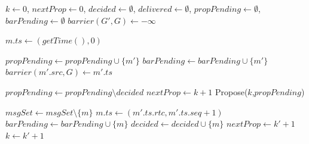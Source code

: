 \documentclass[times, 10pt]{article}
\begin{document}
\begin{algorithm}
\begin{distribalgo}[1]

\blankline
{}
  \STATE $k \leftarrow 0$, $nextProp \leftarrow 0$, $decided \leftarrow \emptyset$, $delivered \leftarrow \emptyset$, $propPending \leftarrow \emptyset$, $barPending \leftarrow \emptyset$
    \STATE $barrier(G',G) \leftarrow -\infty$ 
  \ENDINDENT
\ENDINDENT 

\blankline
{}
  \STATE $m.ts \leftarrow (getTime(),0)$
  \STATE {} \label{algline:rmlocal}
\ENDINDENT

\blankline
{}
    \STATE $propPending \leftarrow propPending \cup \{m'\}$ \label{algline:addtoproppending}
    \STATE $barPending \leftarrow barPending \cup \{m'\}$ \label{algline:insbp1}
    \STATE $barrier(m'.src,G) \leftarrow m'.ts$ \label{algline:incbar}
  \ENDIF
\ENDINDENT

\blankline
{}
    \STATE $propPending \leftarrow propPending \setminus decided$%
    \label{algline:removedecided}
      \STATE $nextProp \leftarrow k + 1$
      \STATE Propose($k$,$propPending$) \label{algline:propose}
    \ENDIF
\ENDINDENT

\blankline
{}
    \STATE $msgSet \leftarrow msgSet \setminus \{m\}$
      \STATE $m.ts \leftarrow (m'.ts.rtc, m'.ts.seq + 1)$
    \ENDIF     
     \label{algline:checkcons}
      \STATE $barPending \leftarrow barPending \cup \{m\}$  \label{algline:insbp2}
    \ENDIF
    \STATE $decided \leftarrow decided \cup \{m\}$  \label{algline:addtodecided}
    \STATE {} \label{algline:rmothers}
  \ENDINDENT
  \STATE $nextProp \leftarrow k' + 1$
  \STATE $k \leftarrow k' + 1$
\ENDINDENT


\end{distribalgo}
\end{algorithm}
\end{document}
